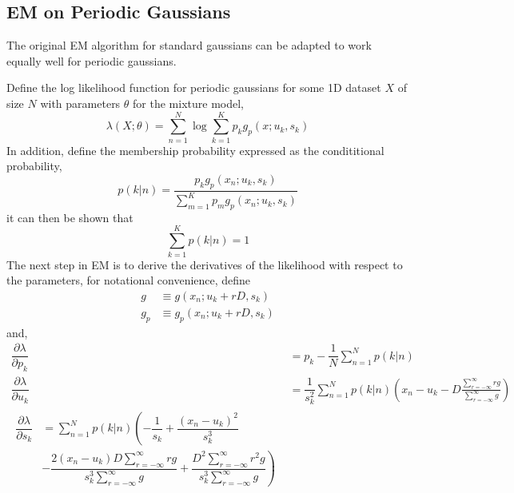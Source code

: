 \documentclass{acm_proc_article-sp}
\begin{document}
\subsection{EM on Periodic Gaussians}

The original EM algorithm for standard gaussians can be adapted to work equally well for periodic gaussians.

Define the log likelihood function for periodic gaussians for some 1D dataset \textbf{$X$} of size \textbf{$N$} with parameters \textbf{$\theta$} for the mixture model,
\begin{equation}
\lambda(X; \theta) = \sum_{n=1}^{N} \log \sum_{k=1}^{K} p_k g_p(x;u_k, s_k)
\end{equation}
In addition, define the membership probability expressed as the condititional probability,
\begin{equation}
p(k|n) = \dfrac{p_k g_p(x_n; u_k, s_k)}{\sum\limits^{K}_{m=1} p_m g_p(x_n; u_k, s_k)}
\end{equation}
it can then be shown that
\begin{equation}
\sum_{k=1}^{K} p(k|n) = 1
\end{equation}
The next step in EM is to derive the derivatives of the likelihood with respect to the parameters, for notational convenience, define
\begin{align*}
g & \equiv g(x_n; u_k+rD, s_k) \\
g_p & \equiv g_p(x_n; u_k+rD, s_k)
\end{align*}
and,
\begin{align}
\dfrac{\partial \lambda}{\partial p_k} & = p_k - \dfrac{1}{N} \sum\limits^{N}_{n=1}p(k|n) \\
\dfrac{\partial \lambda}{\partial u_k} &= \dfrac{1}{s_k^2} \sum_{n=1}^{N}p(k|n) \left(x_n - u_k - D \frac{\sum\limits^{\infty}_{r=-\infty} rg}{\sum\limits^{\infty}_{r=-\infty}g} \right) \\
\begin{split}
\dfrac{\partial \lambda}{\partial s_k} & = \sum\limits^{N}_{n=1}p(k|n) \left(-\dfrac{1}{s_k} + \dfrac{(x_n-u_k)^2}{s_k^3}\right. \\
&\left. -\dfrac{2(x_n-u_k)D\sum\limits^{\infty}_{r=-\infty}rg}{s_k^3 \sum\limits^{\infty}_{r=-\infty}g} + \dfrac{D^2 \sum\limits^{\infty}_{r=-\infty}r^2g}{s_k^3 \sum\limits^{\infty}_{r=-\infty}g} \right)
\end{split}
\end{align}
\end{document}
